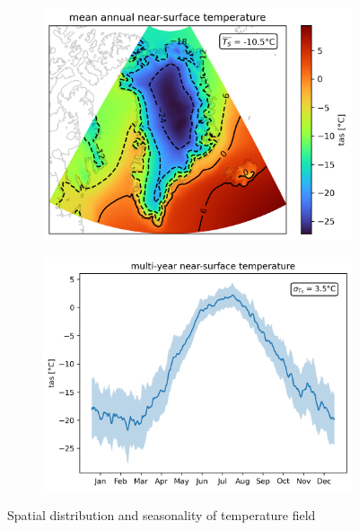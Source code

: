 \begin{figure}[h]
	\centering
	\begin{subfigure}{0.49\textwidth}
		\centering
		\includegraphics[width=\textwidth]{../../era5/figs/tas-annual-mean.png}
	\end{subfigure}
	\begin{subfigure}{0.49\textwidth}
		\centering
		\includegraphics[width=\textwidth]{../../era5/figs/tas-seasonality.png}
	\end{subfigure}
	\caption{Spatial distribution and seasonality of temperature field}
	\label{fig:era5}
\end{figure}

